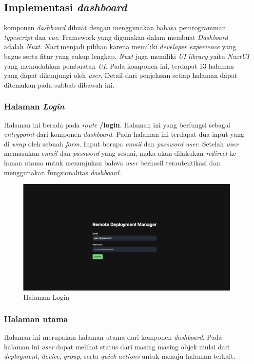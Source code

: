 \subsection{Implementasi \textit{dashboard}}
komponen \textit{dashboard} dibuat dengan menggunakan bahasa pemrogramman \textit{typescript} dan \textit{vue}. Framework yang digunakan dalam membuat \textit{Dashboard} adalah \textit{Nuxt}. \textit{Nuxt} menjadi pilihan karena memiliki \textit{developer experience} yang bagus serta fitur yang cukup lengkap. \textit{Nuxt} juga memiliki \textit{UI library} yaitu \textit{NuxtUI} yang memudahkan pembuatan \textit{UI}. Pada komponen ini, terdapat 13 halaman yang dapat dikunjungi oleh \textit{user}. Detail dari penjelasan setiap halaman dapat ditemukan pada subbab dibawah ini.

\subsubsection{Halaman \textit{Login}}
Halaman ini berada pada \textit{route} \textbf{/login}. Halaman ini yang berfungsi sebagai \textit{entrypoint} dari komponen \textit{dashboard}. Pada halaman ini terdapat dua input yang di \textit{wrap} oleh sebuah \textit{form}. Input berupa \textit{email} dan \textit{password} \textit{user}. Setelah \textit{user} memasukan \textit{email} dan \textit{password} yang sesuai, maka akan dilakukan \textit{redirect} ke laman utama untuk menunjukan bahwa \textit{user} berhasil terautentikasi dan menggunakan fungsionalitas \textit{dashboard}.

\begin{figure}[h]
  \centering
  \includegraphics[width=1\textwidth]{resources/chapter-4/dashboard/login-page.jpg}
  \caption{Halaman Login}
  \label{fig:halaman-login}
\end{figure}

\subsubsection{Halaman utama}
Halaman ini merupakan halaman utama dari komponen \textit{dashboard}. Pada halaman ini \textit{user} dapat melihat status dari masing masing objek mulai dari \textit{deployment}, \textit{device}, \textit{group}, serta \textit{quick actions} untuk menuju halaman terkait.

